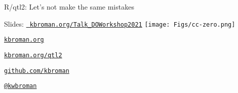 \documentclass[12pt,t,aspectratio=169]{beamer}
\begin{document}
\begin{frame}[c]{R/qtl2: \color{foreground} Let's not make the same mistakes}

  \bbi
{}
\ei

\end{frame}




\begin{frame}[c]{}

\Large

{Slides:} \href{https://kbroman.org/Talk_DOWorkshop2021}{\tt
  \color{foreground} kbroman.org/Talk\_DOWorkshop2021} \quad
\texttt{[image: Figs/cc-zero.png]}

\vspace{7mm}

\href{https://kbroman.org}{\tt kbroman.org}

\vspace{7mm}

\href{https://kbroman.org/qtl2}{\tt kbroman.org/qtl2}

\vspace{7mm}

\href{https://github.com/kbroman}{\tt github.com/kbroman}

\vspace{7mm}

\href{https://twitter.com/kwbroman}{\tt @kwbroman}


\end{frame}
\end{document}

